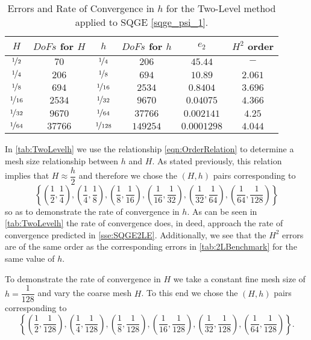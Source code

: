 \begin{table}[H]
  \begin{center}
  \begin{tabular}{|c|c|c|c|c|c|}
    \hline
    $H$ & $DoFs$ for $H$ & $h$ & $DoFs$ for $h$ & $e_2$ & $H^2$ order \\
    \hline
    $\nicefrac{1}{2}$ & $70$ & $\nicefrac{1}{4}$ & $206$ & $45.44$ & $-$ \\[0.2em] 
    $\nicefrac{1}{4}$ & $206$ & $\nicefrac{1}{8}$ & $694$ & $10.89$ & $2.061$ \\[0.2em] 
    $\nicefrac{1}{8}$ & $694$ &$\nicefrac{1}{16}$ & $2534$ & $0.8404$ & $3.696$ \\[0.2em] 
    $\nicefrac{1}{16}$ & $2534$ & $\nicefrac{1}{32}$ & $9670$ & $0.04075$ & $4.366$ \\[0.2em] 
    $\nicefrac{1}{32}$ & $9670$ & $\nicefrac{1}{64}$ & $37766$ &  $0.002141$ & $4.25$ \\[0.2em] 
    $\nicefrac{1}{64}$ & $37766$ & $\nicefrac{1}{128}$ & $149254$ & $0.0001298$ & $4.044$ \\[0.2em]
    \hline
  \end{tabular}
  \caption{Errors and Rate of Convergence in $h$ for the Two-Level method applied to SQGE \eqref{sqge_psi_1}.}
  \label{tab:TwoLevelh}
  \end{center}
\end{table}

In \autoref{tab:TwoLevelh} we use the relationship \eqref{eqn:OrderRelation} to determine a mesh
size relationship between $h$ and $H$. As stated previously, this relation implies that $H \approx
\dfrac{h}{2}$ and therefore we chose the $(H,h)$ pairs corresponding to 
\begin{equation*}
  \left\{ \left(\frac{1}{2}, \frac{1}{4}\right),
  \left(\frac{1}{4}, \frac{1}{8}\right),
  \left(\frac{1}{8}, \frac{1}{16}\right),
  \left(\frac{1}{16}, \frac{1}{32}\right),
  \left(\frac{1}{32}, \frac{1}{64}\right),
  \left(\frac{1}{64}, \frac{1}{128}\right)\right\}
\end{equation*}
so as to demonstrate the rate of convergence in $h$. As can be seen in \autoref{tab:TwoLevelh} the
rate of convergence does, in deed, approach the rate of convergence predicted in
\autoref{sse:SQGE2LE}. Additionally, we see that the $H^2$ errors are of the same order
as the corresponding errors in \autoref{tab:2LBenchmark} for the same value of $h$.

To demonstrate the rate of convergence in $H$ we take a constant fine mesh size of
$h=\dfrac{1}{128}$ and vary the coarse mesh $H$. To this end we chose the $(H,h)$ pairs
corresponding to 
\begin{equation*}
  \left\{ \left(\frac{1}{2}, \frac{1}{128}\right),
  \left(\frac{1}{4}, \frac{1}{128}\right),
  \left(\frac{1}{8}, \frac{1}{128}\right),
  \left(\frac{1}{16}, \frac{1}{128}\right),
  \left(\frac{1}{32}, \frac{1}{128}\right),
  \left(\frac{1}{64}, \frac{1}{128}\right)\right\}.
\end{equation*}

